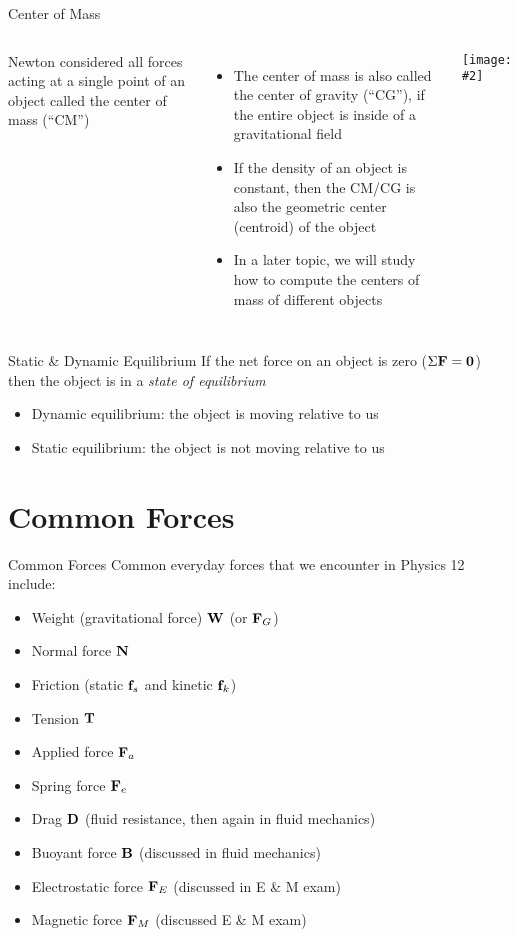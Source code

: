 \documentclass[12pt,compress,aspectratio=169]{beamer}
\newcommand{\pic}[2]{\texttt{[image: \#2]}}
\newcommand{\mb}[1]{\ensuremath\mathbf{#1}}
\begin{document}
\begin{frame}{Center of Mass}
  \begin{columns}
    Newton considered all forces acting at a single point of an object called
    the center of mass (``CM'')
    \begin{itemize}
    \item The center of mass is also called the center of gravity (``CG''), if
      the entire object is inside of a gravitational field
    \item If the density of an object is constant, then the CM/CG is also the
      geometric center (centroid) of the object
    \item In a later topic, we will study how to compute the centers of mass of
      different objects
    \end{itemize}

    \pic{1}{graphics/cofm.png}
  \end{columns}
\end{frame}

\begin{frame}{Static \& Dynamic Equilibrium}
  If the net force on an object is zero ($\Sigma\mb{F}=\mb{0}$) then the
  object is in a \emph{state of equilibrium}
  \begin{itemize}
  \item Dynamic equilibrium: the object is moving relative to us
  \item Static equilibrium: the object is not moving relative to us
  \end{itemize}
\end{frame}


\section{Common Forces}

\begin{frame}{Common Forces}
  Common everyday forces that we encounter in Physics 12 include:
  \begin{itemize}
  \item Weight (gravitational force) $\mb{W}$ (or $\mb{F}_G$)
  \item Normal force $\mb{N}$
  \item Friction (static $\mb{f}_s$ and kinetic $\mb{f}_k$)
  \item Tension $\mb{T}$
  \item Applied force $\mb{F}_a$
  \item Spring force $\mb{F}_e$
  \item Drag $\mb{D}$ (fluid resistance, then again in fluid mechanics)
  \item Buoyant force $\mb{B}$ (discussed in fluid mechanics)
  \item Electrostatic force $\mb{F}_E$ (discussed in E \& M exam)
  \item Magnetic force $\mb{F}_M$ (discussed E \& M exam)
  \end{itemize}
\end{frame}
\end{document}
